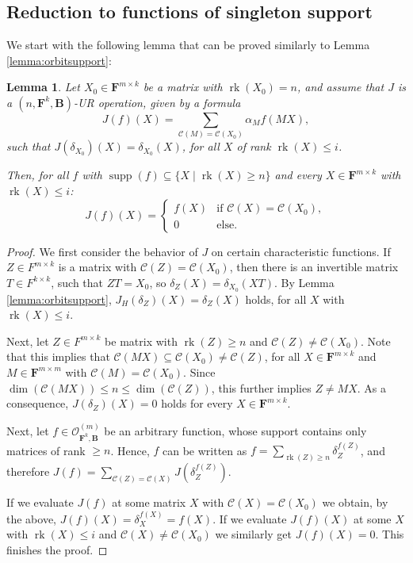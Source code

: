 \documentclass[11pt]{amsart}
\theoremstyle{plain}
\newtheorem{lemma}[thm]{Lemma}
\theoremstyle{definition}
\newcommand{\F}{{\mathbf F}}
\newcommand{\alg}[1]{\mathbf{#1}}
\newcommand{\clonoid}[1]{\mathcal{#1}}
\newcommand{\clodO}{\clonoid{O}}
\newcommand{\algB}{\alg{B}}
\DeclareMathOperator{\rk}{rk}
\DeclareMathOperator{\supp}{supp}
\newcommand{\Col}[1]{\mathcal{C}(#1)}
\begin{document}
\subsection{Reduction to functions of singleton support} \label{sect:induction}

We start with the following lemma that can be proved similarly to Lemma \ref{lemma:orbitsupport}:

\begin{lemma} \label{lemma:basicinterpolation}
Let $X_0 \in \F^{m \times k}$ be a matrix with $\rk(X_0) = n$, and assume that $J$ is a $(n,\F^k,\algB)$-UR operation, given by a formula
\begin{equation} \label{eq:basicint1}
J(f)(X) = \sum_{\Col{M}=\Col{X_0}} \alpha_M f(MX),
\end{equation}
such that $J(\delta_{X_0})(X) = \delta_{X_0}(X)$, for all $X$ of rank $\rk(X) \leq i$.

Then, for all $f$ with $\supp(f) \subseteq \{X \mid \rk(X) \geq n\}$ and every $X\in \F^{m \times k}$ with $\rk(X) \leq i$:
\begin{equation}
J(f)(X) = \begin{cases} f(X) &\text{if } \Col{X} = \Col{X_0},\\
0 & \text{else}. \end{cases}
\end{equation}
\end{lemma}

\begin{proof}
We first consider the behavior of $J$ on certain characteristic functions. If $Z \in F^{m \times k}$ is a matrix with $\Col{Z} = \Col{X_0}$, then there is an invertible matrix $T \in F^{k \times k}$, such that $ZT = X_0$, so $\delta_Z({X}) = \delta_{X_0}(XT)$. By Lemma \ref{lemma:orbitsupport}, $J_H(\delta_Z)(X) = \delta_Z(X)$ holds, for all $X$ with $\rk(X) \leq i$.

Next, let $Z \in F^{m \times k}$ be matrix with $\rk(Z) \geq n$ and $\Col{Z} \neq \Col{X_0}$. Note that this implies that $\Col{MX} \subseteq \Col{X_0} \neq \Col{Z}$, for all $X \in \F^{m\times k}$ and $M\in \F^{m\times m}$ with $\Col{M} = \Col{X_0}$. Since $\dim(\Col{MX}) \leq n \leq \dim(\Col{Z})$, this further implies $Z \neq MX$. As a consequence, $J(\delta_Z)(X) = 0$ holds for every $X\in \F^{m\times k}$.

Next, let $f \in \clodO_{\F^k,\algB}^{(m)}$ be an arbitrary function, whose support contains only matrices of rank $\geq n$. Hence, $f$ can be written as $f= \sum_{\rk(Z) \geq n} \delta_Z^{f(Z)}$, and therefore $J(f) = \sum_{\Col{Z} = \Col{X}} J(\delta_Z^{f(Z)})$. 

If we evaluate $J(f)$ at some matrix $X$ with $\Col{X} = \Col{X_0}$ we obtain, by the above, $J(f)(X) = \delta_X^{f(X)} = f(X)$. If we evaluate $J(f)(X)$ at some $X$ with $\rk(X) \leq i$ and $\Col{X} \neq \Col{X_0}$ we similarly get $J(f)(X) = 0$. This finishes the proof.
\end{proof}
\end{document}
